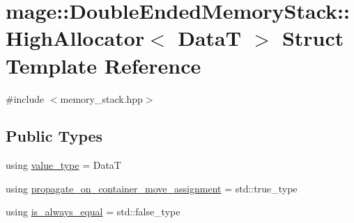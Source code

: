 \hypertarget{structmage_1_1_double_ended_memory_stack_1_1_high_allocator}{}\section{mage\+:\+:Double\+Ended\+Memory\+Stack\+:\+:High\+Allocator$<$ DataT $>$ Struct Template Reference}
\label{structmage_1_1_double_ended_memory_stack_1_1_high_allocator}


{\ttfamily \#include $<$memory\+\_\+stack.\+hpp$>$}

\subsection*{Public Types}
\begin{DoxyCompactItemize}
\item 
using \hyperlink{structmage_1_1_double_ended_memory_stack_1_1_high_allocator_a43b87cea37b3bbba57ca794e9785e82d}{value\+\_\+type} = DataT
\item 
using \hyperlink{structmage_1_1_double_ended_memory_stack_1_1_high_allocator_a62088aeffb56b35539d9080aabc43134}{propagate\+\_\+on\+\_\+container\+\_\+move\+\_\+assignment} = std\+::true\+\_\+type
\item 
using \hyperlink{structmage_1_1_double_ended_memory_stack_1_1_high_allocator_af6ec362496ffae52532f1bb57170edf7}{is\+\_\+always\+\_\+equal} = std\+::false\+\_\+type
\end{DoxyCompactItemize}
